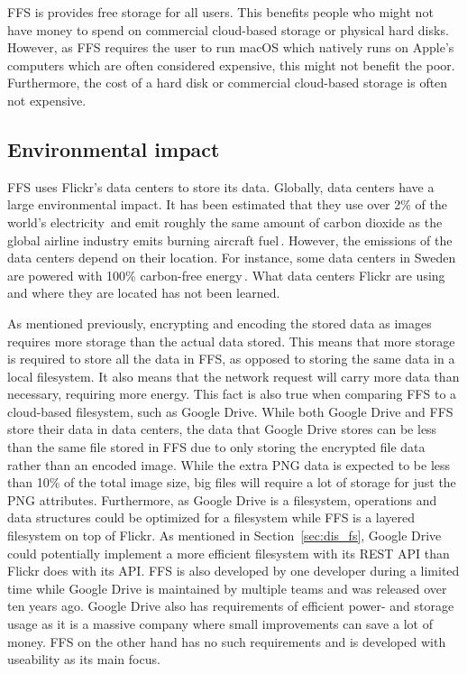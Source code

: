 \gls{FFS} is provides free storage for all users. This benefits people who might not have money to spend on commercial \mbox{cloud-based} storage or physical hard disks. However, as \gls{FFS} requires the user to run macOS which natively runs on Apple's computers which are often considered expensive, this might not benefit the poor. Furthermore, the cost of a hard disk or commercial \mbox{cloud-based} storage is often not expensive.

\subsection{Environmental impact}
\label{subsec:imp_env}
\gls{FFS} uses Flickr's data centers to store its data. Globally, data centers have a large environmental impact. It has been estimated that they use over 2\% of the world's electricity\,\cite{mcleanDataCentersGenerate2020} and emit roughly the same amount of carbon dioxide as the global airline industry emits burning aircraft fuel\,\cite{pearceEnergyHogsCan}. However, the emissions of the data centers depend on their location. For instance, some data centers in Sweden are powered with 100\% carbon-free energy\,\cite{cappellaSwedenSustainableData2022,unfcccEcoDataCenterSwedenUNFCCC}. What data centers Flickr are using and where they are located has not been learned.

As mentioned previously, encrypting and encoding the stored data as images requires more storage than the actual data stored. This means that more storage is required to store all the data in \gls{FFS}, as opposed to storing the same data in a local filesystem. It also means that the network request will carry more data than necessary, requiring more energy. This fact is also true when comparing \gls{FFS} to a \mbox{cloud-based} filesystem, such as Google Drive. While both Google Drive and \gls{FFS} store their data in data centers, the data that Google Drive stores can be less than the same file stored in \gls{FFS} due to only storing the encrypted file data rather than an encoded image. While the extra \gls{PNG} data is expected to be less than 10\% of the total image size, big files will require a lot of storage for just the \gls{PNG} attributes. Furthermore, as Google Drive is a filesystem, operations and data structures could be optimized for a filesystem while \gls{FFS} is a layered filesystem on top of Flickr. As mentioned in Section~\ref{sec:dis_fs}, Google Drive could potentially implement a more efficient filesystem with its REST \gls{API} than Flickr does with its \gls{API}. \gls{FFS} is also developed by one developer during a limited time while Google Drive is maintained by multiple teams and was released over ten years ago. Google Drive also has requirements of efficient power- and storage usage as it is a massive company where small improvements can save a lot of money. \gls{FFS} on the other hand has no such requirements and is developed with useability as its main focus. 

